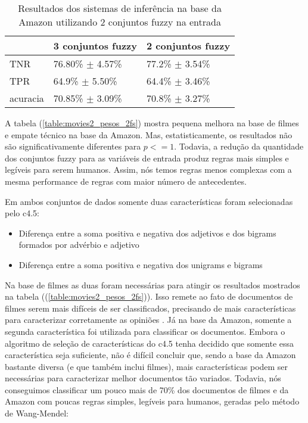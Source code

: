 \documentclass[template.tex]{subfiles}
\begin{document}
\begin{table}[!h]
    \begin{tabular}{lll}
    ~                   & 3 conjuntos fuzzy                             & 2 conjuntos fuzzy \\ \hline
    TNR                 & 76.80\% $\pm$ 4.57\%              & 77.2\% $\pm$ 3.54\%    \\
    TPR             & 64.9\% $\pm$ 5.50\%                   & 64.4\% $\pm$ 3.46\%   \\
    acuracia        & 70.85\% $\pm$ 3.09\%              & 70.8\% $\pm$ 3.27\%    \\
    \end{tabular}
    \caption{Resultados dos sistemas de inferência na base da Amazon utilizando 2 conjuntos fuzzy na entrada}
    \label{table:amazon2_pesos_2fs}
\end{table}

%
%
%

A tabela (\ref{table:movies2_pesos_2fs}) mostra pequena melhora na base de filmes e empate técnico na base da Amazon. Mas, estatisticamente, os resultados não são significativamente diferentes para $p <= 1$. Todavia, a redução da quantidade dos conjuntos fuzzy para as variáveis de entrada produz regras mais simples e legíveis para serem humanos. Assim, nós temos regras menos complexas com a mesma performance de regras com maior número de antecedentes. 

Em ambos conjuntos de dados somente duas características foram selecionadas pelo c4.5:
\begin{itemize}
\item Diferença entre a soma positiva e negativa dos adjetivos e dos bigrams formados por advérbio e adjetivo
\item Diferença entre a soma positiva e negativa dos unigrams e bigrams
\end{itemize}

Na base de filmes as duas foram necessárias para atingir os resultados mostrados na tabela ((\ref{table:movies2_pesos_2fs})). Isso remete ao fato de documentos de filmes serem mais difíceis de ser classificados, precisando de mais características para caracterizar corretamente as opiniões \cite{turney2002thumbs, pang2004sentimental, chaovalit2005movie, ohana2009sentiment}. Já na base da Amazon, somente a segunda característica foi utilizada para classificar os documentos. Embora o algoritmo de seleção de características do c4.5 tenha decidido que somente essa característica seja suficiente, não é difícil concluir que, sendo a base da Amazon bastante diversa (e que também inclui filmes), mais características podem ser necessárias para caracterizar melhor documentos tão variados.
Todavia, nós conseguimos classificar um pouco mais de 70\% dos documentos de filmes e da Amazon com poucas regras simples, legíveis para humanos, geradas pelo método de Wang-Mendel:
\end{document}
